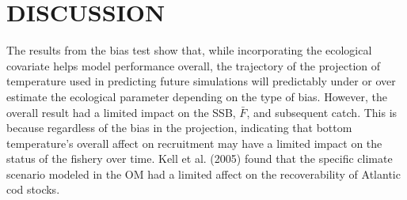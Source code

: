\documentclass[
  12pt,
]{article}
\begin{document}
\section{DISCUSSION}\label{discussion}

The results from the bias test show that, while incorporating the ecological covariate helps model performance overall, the trajectory of the projection of temperature used in predicting future simulations will predictably under or over estimate the ecological parameter depending on the type of bias. However, the overall result had a limited impact on the SSB, \(\bar{F}\), and subsequent catch. This is because regardless of the bias in the projection, indicating that bottom temperature's overall affect on recruitment may have a limited impact on the status of the fishery over time. Kell et al. (2005) found that the specific climate scenario modeled in the OM had a limited affect on the recoverability of Atlantic cod stocks.
\end{document}
